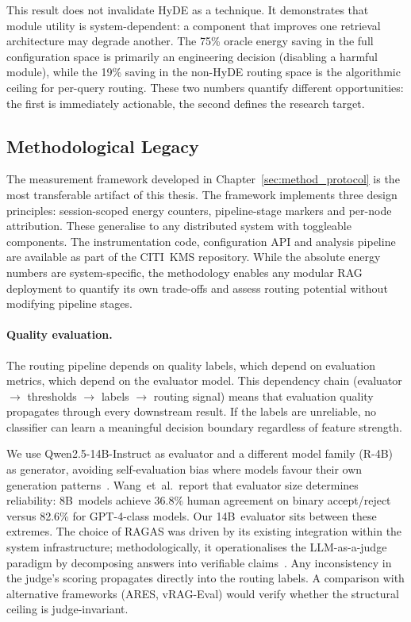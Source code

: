 This result does not invalidate HyDE as a technique.  It demonstrates
that module utility is system-dependent: a component that improves one
retrieval architecture may degrade another.  The 75\% oracle energy
saving in the full configuration space is primarily an engineering
decision (disabling a harmful module), while the 19\% saving in the
non-HyDE routing space is the algorithmic ceiling for per-query routing.
These two numbers quantify different opportunities: the first is
immediately actionable, the second defines the research target.


\subsection{Methodological Legacy}
\label{subsec:methodology}

The measurement framework developed in
Chapter~\ref{sec:method_protocol} is the most transferable artifact of
this thesis.  The framework implements three design principles:
session-scoped energy counters, pipeline-stage markers and per-node
attribution.  These generalise to any distributed system with toggleable
components.  The instrumentation code, configuration API and analysis
pipeline are available as part of the CITI~KMS repository.  While the
absolute energy numbers are system-specific, the methodology enables any
modular RAG deployment to quantify its own trade-offs and assess routing
potential without modifying pipeline stages.

\paragraph{Quality evaluation.}
The routing pipeline depends on quality labels, which depend on evaluation
metrics, which depend on the evaluator model.  This dependency chain
(evaluator $\to$ thresholds $\to$ labels $\to$ routing signal) means
that evaluation quality propagates through every downstream result.
If the labels are unreliable, no classifier can learn a meaningful
decision boundary regardless of feature strength.

We use Qwen2.5-14B-Instruct as evaluator and a different model family
(R-4B) as generator, avoiding self-evaluation bias where models favour
their own generation patterns~\cite{vrageval2024}.  Wang~et~al.\ report
that evaluator size determines reliability: 8B~models achieve 36.8\%
human agreement on binary accept/reject versus 82.6\% for
GPT-4-class models.  Our 14B~evaluator sits between these extremes.
The choice of RAGAS was driven by its existing integration within the
system infrastructure; methodologically, it operationalises the
LLM-as-a-judge paradigm by decomposing answers into verifiable
claims~\cite{ragevalsurvey2025}.  Any inconsistency in the judge's
scoring propagates directly into the routing labels.  A comparison with
alternative frameworks (ARES, vRAG-Eval) would verify whether the
structural ceiling is judge-invariant.

